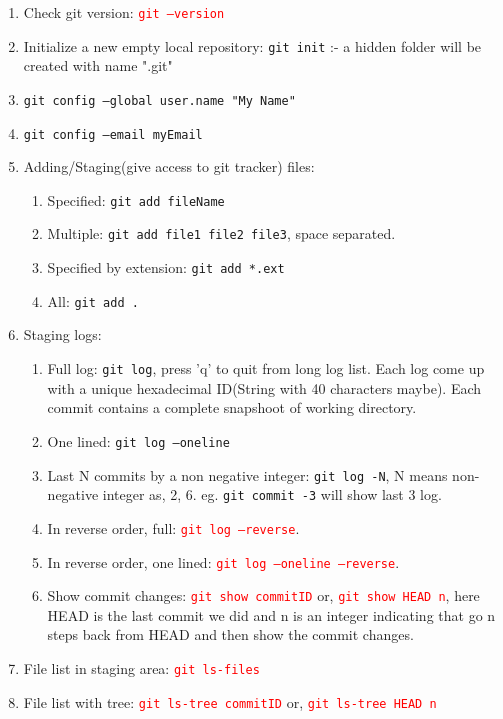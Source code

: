 \documentclass[10 pt]{article}
\newcommand{\R}{\textcolor{red}} %
\newcommand{\T}{\texttt}
\begin{document}
\begin{enumerate}
	\item Check git version: \R{\T{git --version}}
	\item Initialize a new empty local repository: \texttt{git init} :- a hidden folder will be created with name ".git"
	\item \texttt{git config --global user.name "My Name"}
	\item \texttt{git config --email myEmail}
	\item Adding/Staging(give access to git tracker) files:
		\begin{enumerate}
			\item Specified: \texttt{git add fileName}
			\item Multiple: \texttt{git add file1 file2 file3}, space separated.
			\item Specified by extension: \texttt{git add *.ext}
			\item All: \texttt{git add .}
		\end{enumerate}
	\item Staging logs:
		\begin{enumerate}
			\item Full log: \texttt{git log}, press 'q' to quit from long log list. Each log come up with a unique hexadecimal ID(String with 40 characters maybe). Each commit contains a complete snapshoot of working directory.
			\item One lined: \texttt{git log --oneline}
			\item Last N commits by a non negative integer: \texttt{git log -N}, N means non-negative integer as, 2, 6. eg. \texttt{git commit -3} will show last 3 log.
			\item In reverse order, full: \R{\T{git log --reverse}}.
			\item In reverse order, one lined: \R{\T{git log --oneline --reverse}}.
			\item Show commit changes: \R{\T{git show commitID}} or, \R{\T{git show HEAD~n}}, here HEAD is the last commit we did and n is an integer indicating that go n steps back from HEAD and then show the commit changes.
		\end{enumerate}
	\item File list in staging area: \R{\T{git ls-files}}
	\item File list with tree: \R{\T{git ls-tree commitID}}	or, \R{\T{git ls-tree HEAD~n}}
	

\end{enumerate}
\end{document}

